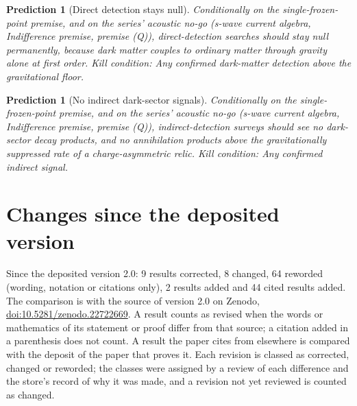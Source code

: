 \documentclass[11pt]{article}
\newtheorem{prediction}[theorem]{Prediction}
\theoremstyle{definition}
\theoremstyle{plain}
\begin{document}
\begin{prediction}[Direct detection stays null]\label{c:pred.dark-matter-direct-detection-null}
Conditionally on the single-frozen-point premise, and on the series' acoustic no-go (s-wave current algebra, Indifference premise, premise (Q)), direct-detection searches should stay null permanently, because dark matter couples to ordinary matter through gravity alone at first order.
\emph{Kill condition:} Any confirmed dark-matter detection above the gravitational floor.
\end{prediction}

\begin{prediction}[No indirect dark-sector signals]\label{c:pred.no-indirect-dark-signals}
Conditionally on the single-frozen-point premise, and on the series' acoustic no-go (s-wave current algebra, Indifference premise, premise (Q)), indirect-detection surveys should see no dark-sector decay products, and no annihilation products above the gravitationally suppressed rate of a charge-asymmetric relic.
\emph{Kill condition:} Any confirmed indirect signal.
\end{prediction}

\section*{Changes since the deposited version}
Since the deposited version 2.0: 9 results corrected, 8 changed, 64 reworded (wording, notation or citations only), 2 results added and 44 cited results added. The comparison is with the source of version 2.0 on Zenodo, \href{https://doi.org/10.5281/zenodo.22722669}{doi:10.5281/zenodo.22722669}. A result counts as revised when the words or mathematics of its statement or proof differ from that source; a citation added in a parenthesis does not count. A result the paper cites from elsewhere is compared with the deposit of the paper that proves it. Each revision is classed as corrected, changed or reworded; the classes were assigned by a review of each difference and the store's record of why it was made, and a revision not yet reviewed is counted as changed.
\end{document}
